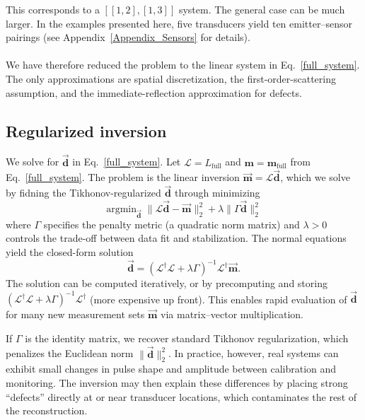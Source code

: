 \documentclass[a4paper,fleqn]{cas-sc}
\begin{document}
This corresponds to a $[[1,2],[1,3]]$ system. The general case can be much larger. In the examples presented here, five transducers yield ten emitter--sensor pairings (see Appendix~\ref{Appendix_Sensors} for details).
\paragraph{}

We have therefore reduced the problem to the linear system in Eq.~\eqref{full_system}. The only approximations are spatial discretization, the first-order-scattering assumption, and the immediate-reflection approximation for defects.



\subsection{Regularized inversion}\label{Regularized inversion}
We solve for $\vec{\mathbf{d}}$ in Eq.~\ref{full_system}. Let $\mathcal{L} = L_{\mathrm{full}}$ and $\mathbf{m} = \mathbf{m}_{\mathrm{full}}$ from Eq.~\ref{full_system}. The problem is the linear inversion
$\mathbf{\vec m} = \mathcal{L}\mathbf{\vec d}$, which we solve by fidning the Tikhonov-regularized $\mathbf{\vec d}$ through minimizing
\begin{equation}\label{eq:objective}
\text{argmin}_{\vec{\textbf{d}}} \; \|\mathcal{L}\mathbf{\vec d} - \mathbf{\vec m}\|_2^2 + \lambda \| \Gamma \mathbf{\vec d} \|_2^2
\end{equation}
where $\Gamma$ specifies the penalty metric (a quadratic norm matrix) and $\lambda>0$ controls the trade-off between data fit and stabilization. The normal equations yield the closed-form solution \cite{tikhonovintro,Matrix_formalism_tikhonov}
\begin{equation}\label{eq:tik_gamma}
\vec{\mathbf{d}} = (\mathcal{L}^\dagger \mathcal{L} + \lambda \Gamma)^{-1} \mathcal{L}^\dagger \mathbf{\vec m}.
\end{equation}
The solution can be computed iteratively, or by precomputing and storing $(\mathcal{L}^\dagger \mathcal{L} + \lambda \Gamma)^{-1} \mathcal{L}^\dagger$ (more expensive up front). This enables rapid evaluation of $\vec{\mathbf{d}}$ for many new measurement sets $\mathbf{\vec m}$ via matrix--vector multiplication.

If $\Gamma$ is the identity matrix, we recover standard Tikhonov regularization, which penalizes the Euclidean norm $\|\vec{\mathbf{d}}\|_2^2$. In practice, however, real systems can exhibit small changes in pulse shape and amplitude between calibration and monitoring. The inversion may then explain these differences by placing strong ``defects'' directly at or near transducer locations, which contaminates the rest of the reconstruction.
\end{document}
